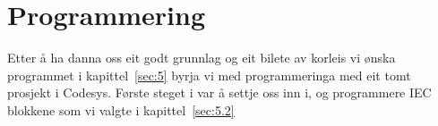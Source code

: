 \chapter{Programmering}
\thispagestyle{fancy}
Etter å ha danna oss eit godt grunnlag og eit bilete av korleis vi ønska programmet i kapittel~\ref{sec:5} 
byrja vi med programmeringa med eit tomt prosjekt i \gls{Codesys}. Første steget i var å 
settje oss inn i, og programmere \gls{IEC} blokkene som vi valgte i kapittel~\ref{sec:5.2}


